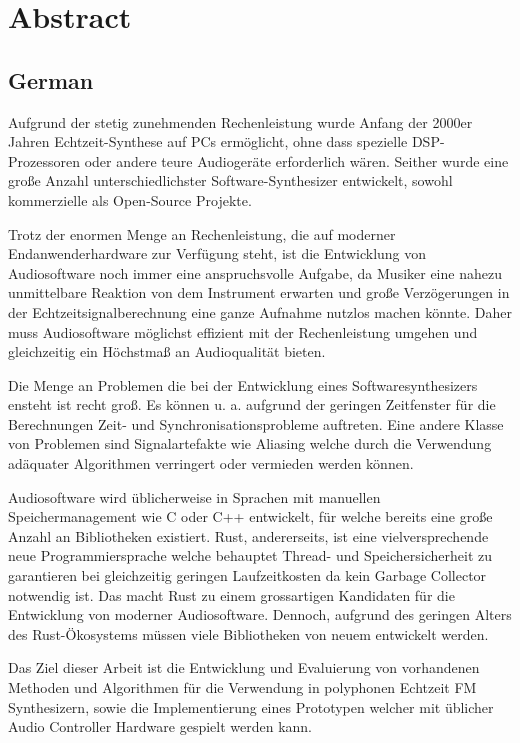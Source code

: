 \chapter*{Abstract}\label{abstract}


\section*{German}

Aufgrund der stetig zunehmenden Rechenleistung wurde Anfang der 2000er Jahren Echtzeit-Synthese auf PCs ermöglicht, ohne dass spezielle DSP-Prozessoren oder andere teure Audiogeräte erforderlich wären.
Seither wurde eine große Anzahl unterschiedlichster Software-Synthesizer entwickelt, sowohl kommerzielle als Open-Source Projekte.

Trotz der enormen Menge an Rechenleistung, die auf moderner Endanwenderhardware zur Verfügung steht, ist die Entwicklung von Audiosoftware noch immer eine anspruchsvolle Aufgabe, da Musiker eine nahezu unmittelbare Reaktion von dem Instrument erwarten und große Verzögerungen in der Echtzeitsignalberechnung eine ganze Aufnahme nutzlos machen könnte.
Daher muss Audiosoftware möglichst effizient mit der Rechenleistung umgehen und gleichzeitig ein Höchstmaß an Audioqualität bieten.

Die Menge an Problemen die bei der Entwicklung eines Softwaresynthesizers ensteht ist recht groß.
Es können u. a. aufgrund der geringen Zeitfenster für die Berechnungen Zeit- und Synchronisationsprobleme auftreten.
Eine andere Klasse von Problemen sind Signalartefakte wie Aliasing welche durch die Verwendung adäquater Algorithmen verringert oder vermieden werden können.

Audiosoftware wird üblicherweise in Sprachen mit manuellen Speichermanagement wie C oder C++ entwickelt, für welche bereits eine große Anzahl an Bibliotheken existiert.
Rust, andererseits, ist eine vielversprechende neue Programmiersprache welche behauptet Thread- und Speichersicherheit zu garantieren bei gleichzeitig geringen Laufzeitkosten da kein Garbage Collector notwendig ist.
Das macht Rust zu einem grossartigen Kandidaten für die Entwicklung von moderner Audiosoftware.
Dennoch, aufgrund des geringen Alters des Rust-Ökosystems müssen viele Bibliotheken von neuem entwickelt werden.

Das Ziel dieser Arbeit ist die Entwicklung und Evaluierung von vorhandenen Methoden und Algorithmen für die Verwendung in polyphonen Echtzeit FM Synthesizern, sowie die Implementierung eines Prototypen welcher mit üblicher Audio Controller Hardware gespielt werden kann.

